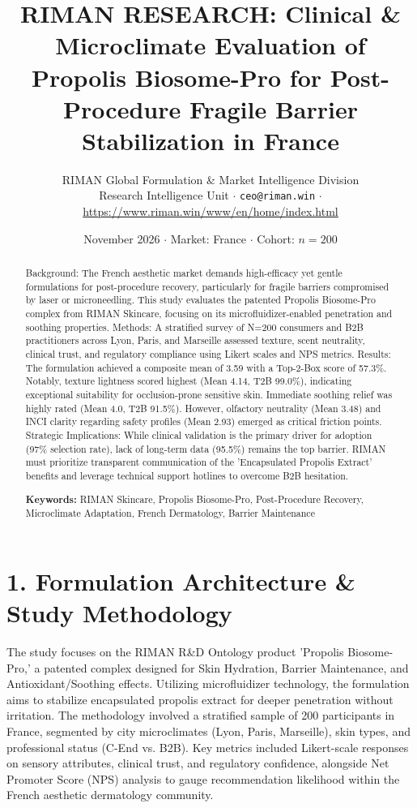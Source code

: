 \documentclass[10pt,twocolumn,a4paper]{article}
\title{\textbf{RIMAN RESEARCH: Clinical \& Microclimate Evaluation of Propolis Biosome-Pro for Post-Procedure Fragile Barrier Stabilization in France}}
\author{RIMAN Global Formulation \& Market Intelligence Division\\
\small Research Intelligence Unit $\cdot$ \texttt{ceo@riman.win} $\cdot$ \url{https://www.riman.win/www/en/home/index.html}}
\date{November 2026 \quad $\cdot$ \quad Market: France \quad $\cdot$ \quad Cohort: $n = 200$}
\begin{document}
\maketitle

\begin{abstract}
Background: The French aesthetic market demands high-efficacy yet gentle formulations for post-procedure recovery, particularly for fragile barriers compromised by laser or microneedling. This study evaluates the patented Propolis Biosome-Pro complex from RIMAN Skincare, focusing on its microfluidizer-enabled penetration and soothing properties. Methods: A stratified survey of N=200 consumers and B2B practitioners across Lyon, Paris, and Marseille assessed texture, scent neutrality, clinical trust, and regulatory compliance using Likert scales and NPS metrics. Results: The formulation achieved a composite mean of 3.59 with a Top-2-Box score of 57.3\%. Notably, texture lightness scored highest (Mean 4.14, T2B 99.0\%), indicating exceptional suitability for occlusion-prone sensitive skin. Immediate soothing relief was highly rated (Mean 4.0, T2B 91.5\%). However, olfactory neutrality (Mean 3.48) and INCI clarity regarding safety profiles (Mean 2.93) emerged as critical friction points. Strategic Implications: While clinical validation is the primary driver for adoption (97\% selection rate), lack of long-term data (95.5\%) remains the top barrier. RIMAN must prioritize transparent communication of the 'Encapsulated Propolis Extract' benefits and leverage technical support hotlines to overcome B2B hesitation.

\vspace{0.4em}
\noindent\textbf{Keywords:} RIMAN Skincare, Propolis Biosome-Pro, Post-Procedure Recovery, Microclimate Adaptation, French Dermatology, Barrier Maintenance
\end{abstract}

\section{1. Formulation Architecture \& Study Methodology}
The study focuses on the RIMAN R\&D Ontology product 'Propolis Biosome-Pro,' a patented complex designed for Skin Hydration, Barrier Maintenance, and Antioxidant/Soothing effects. Utilizing microfluidizer technology, the formulation aims to stabilize encapsulated propolis extract for deeper penetration without irritation. The methodology involved a stratified sample of 200 participants in France, segmented by city microclimates (Lyon, Paris, Marseille), skin types, and professional status (C-End vs. B2B). Key metrics included Likert-scale responses on sensory attributes, clinical trust, and regulatory confidence, alongside Net Promoter Score (NPS) analysis to gauge recommendation likelihood within the French aesthetic dermatology community.
\end{document}
